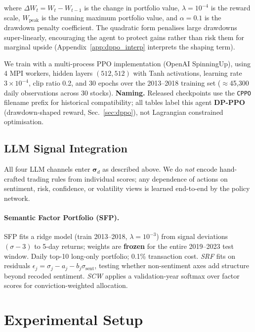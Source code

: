 \documentclass{article}
\begin{document}
where $\Delta W_t = W_t - W_{t-1}$ is the change in portfolio value,
$\lambda = 10^{-4}$ is the reward scale, $W_\text{peak}$ is the
running maximum portfolio value, and $\alpha = 0.1$ is the
drawdown penalty coefficient.
The quadratic form penalises large drawdowns super-linearly,
encouraging the agent to protect gains rather than risk them for
marginal upside (Appendix~\ref{app:dppo_interp} interprets the shaping term).

We train with a multi-process PPO implementation (OpenAI SpinningUp),
using 4 MPI workers, hidden layers $(512, 512)$ with Tanh activations,
learning rate $3 \times 10^{-4}$, clip ratio 0.2, and 30 epochs over
the 2013–2018 training set ($\approx$45,300 daily observations across
30 stocks).
\textbf{Naming.} Released checkpoints use the \texttt{CPPO} filename prefix for historical compatibility; all tables label this agent \textbf{DP-PPO} (drawdown-shaped reward, Sec.~\ref{sec:dppo}), not Lagrangian constrained optimisation.

\subsection{LLM Signal Integration}
\label{sec:integration}
\label{sec:llm_scoring}%

All four LLM channels enter $\boldsymbol{\sigma}_d$ as described above.
We do \emph{not} encode hand-crafted trading rules from individual scores;
any dependence of actions on sentiment, risk, confidence, or volatility
views is learned end-to-end by the policy network.

\paragraph{Semantic Factor Portfolio (SFP).}
SFP fits a ridge model (train 2013--2018, $\lambda{=}10^{-3}$) from signal deviations $(\sigma{-}3)$ to 5-day returns; weights are \textbf{frozen} for the entire 2019--2023 test window.
Daily top-10 long-only portfolio; 0.1\% transaction cost.
\emph{SRF} fits on residuals $\epsilon_j = \sigma_j - a_j - b_j\sigma_\text{sent}$, testing whether non-sentiment axes add structure beyond recoded sentiment.
\emph{SCW} applies a validation-year softmax over factor scores for conviction-weighted allocation.


\section{Experimental Setup}
\label{sec:experiments}
\end{document}
